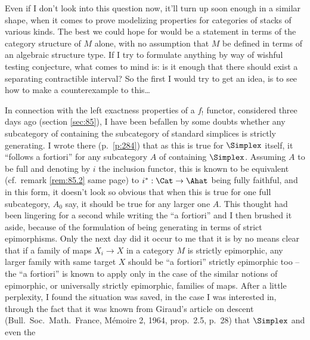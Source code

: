 Even if I don't look into this question now, it'll turn up soon enough
in a similar shape, when it comes to prove modelizing properties for
categories of stacks of various kinds. The best we could hope for
would be a statement in terms of the category structure of $M$ alone,
with no assumption that $M$ be defined in terms of an algebraic
structure type. If I try to formulate anything by way of wishful
testing conjecture, what comes to mind is: is it enough that there
should exist a separating contractible interval? So the first I would
try to get an idea, is to see how to make a counterexample to
this\ldots

\bigbreak
\noindent\hfill{}\par

\label{sec:89}%
In connection with the left exactness properties of a $f_!$ functor,
considered three days ago (section \ref{sec:85}), I have been befallen
by some doubts whether any subcategory of \Cat{} containing the
subcategory of standard simplices is strictly generating. I wrote
there (p.\ \ref{p:284}) that as this is true for $\Simplex$ itself, it
``follows a fortiori'' for any subcategory $A$ of \Cat{} containing
$\Simplex$. Assuming $A$ to be full and denoting by $i$ the inclusion
functor, this is known to be equivalent (cf.\ remark \ref{rem:85.2}
same page) to $i^*:\Cat\to\Ahat$ being fully faithful, and in this
form, it doesn't look so obvious that when this is true for one full
subcategory, $A_0$ say, it should be true for any larger one $A$. This
thought had been lingering for a second while writing the ``a
fortiori'' and I then brushed it aside, because of the formulation of
being generating in terms of strict epimorphisms. Only the next day
did it occur to me that it is by no means clear that if a family of
maps $X_i\to X$ in a category $M$ is strictly epimorphic, any larger
family with same target $X$ should be ``a fortiori'' strictly
epimorphic too -- the ``a fortiori'' is known to apply only in the
case of the similar notions of epimorphic, or universally strictly
epimorphic, families of maps. After a little perplexity, I found the
situation was saved, in the case I was interested in, through the fact
that it was known from Giraud's article on
descent (Bull.\ Soc.\ Math.\ France,
Mémoire 2, 1964, prop.\ 2.5, p.\ 28) that $\Simplex$ and even the
